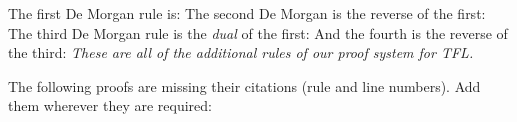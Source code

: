 The first De Morgan rule is:
The second De Morgan is the reverse of the first:
The third De Morgan rule is the \emph{dual} of the first:
And the fourth is the reverse of the third:
\emph{These are all of the additional rules of our proof system for TFL.}

\practiceproblems
\solutions
\problempart
\label{pr.justifyTFLproof}
The following proofs are missing their citations (rule and line numbers). Add them wherever they are required:
\begin{earg}
\item\begin{fitchproof}
 {}
 {}
\end{fitchproof}
\item\begin{fitchproof}
\open
\close
{}
\end{fitchproof}
\item\begin{fitchproof}
\open
	 {}
		\open
	\close
\close
{}
\end{fitchproof}
\end{earg}

